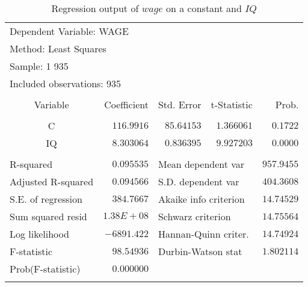 \documentclass[12pt]{report}
\begin{document}
\begin{table}[H]
	\centering
	\begin{tabular}{lrrrr}
		\multicolumn{3}{l}{Dependent Variable: WAGE}&\multicolumn{1}{c}{}&\multicolumn{1}{c}{}\\
		\multicolumn{3}{l}{Method: Least Squares}&\multicolumn{1}{c}{}&\multicolumn{1}{c}{}\\
		\multicolumn{2}{l}{Sample: 1 935}&\multicolumn{1}{c}{}&\multicolumn{1}{c}{}&\multicolumn{1}{c}{}\\
		\multicolumn{3}{l}{Included observations: 935}&\multicolumn{1}{c}{}&\multicolumn{1}{c}{}\\
		[4.5pt] \hline \\ [-4.5pt]
		\multicolumn{1}{c}{Variable}&\multicolumn{1}{r}{Coefficient}&\multicolumn{1}{r}{Std. Error}&\multicolumn{1}{r}{t-Statistic}&\multicolumn{1}{r}{Prob.}\\
		[4.5pt] \hline \\ [-4.5pt]
		\multicolumn{1}{c}{C}&\multicolumn{1}{r}{$116.9916$}&\multicolumn{1}{r}{$85.64153$}&\multicolumn{1}{r}{$1.366061$}&\multicolumn{1}{r}{$0.1722$}\\
		\multicolumn{1}{c}{IQ}&\multicolumn{1}{r}{$8.303064$}&\multicolumn{1}{r}{$0.836395$}&\multicolumn{1}{r}{$9.927203$}&\multicolumn{1}{r}{$0.0000$}\\
		[4.5pt] \hline \\ [-4.5pt]
		\multicolumn{1}{l}{R-squared}&\multicolumn{1}{r}{$0.095535$}&\multicolumn{2}{l}{Mean dependent var}&\multicolumn{1}{r}{$957.9455$}\\
		\multicolumn{1}{l}{Adjusted R-squared}&\multicolumn{1}{r}{$0.094566$}&\multicolumn{2}{l}{S.D. dependent var}&\multicolumn{1}{r}{$404.3608$}\\
		\multicolumn{1}{l}{S.E. of regression}&\multicolumn{1}{r}{$384.7667$}&\multicolumn{2}{l}{Akaike info criterion}&\multicolumn{1}{r}{$14.74529$}\\
		\multicolumn{1}{l}{Sum squared resid}&\multicolumn{1}{r}{$1.38E+08$}&\multicolumn{2}{l}{Schwarz criterion}&\multicolumn{1}{r}{$14.75564$}\\
		\multicolumn{1}{l}{Log likelihood}&\multicolumn{1}{r}{$-6891.422$}&\multicolumn{2}{l}{Hannan-Quinn criter.}&\multicolumn{1}{r}{$14.74924$}\\
		\multicolumn{1}{l}{F-statistic}&\multicolumn{1}{r}{$98.54936$}&\multicolumn{2}{l}{Durbin-Watson stat}&\multicolumn{1}{r}{$1.802114$}\\
		\multicolumn{1}{l}{Prob(F-statistic)}&\multicolumn{1}{r}{$0.000000$}&\multicolumn{1}{c}{}&\multicolumn{1}{c}{}&\multicolumn{1}{c}{}\\
		[4.5pt] \hline \\ [-4.5pt]
	\end{tabular}
	\caption{Regression output of $wage$ on a constant and $IQ$}
\end{table}
\end{document}
